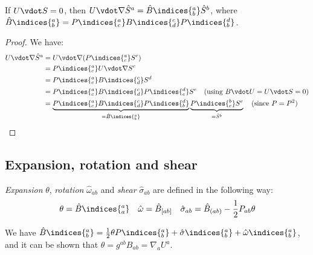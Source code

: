 \documentclass{jknotes}
\begin{document}
\begin{lemma}
    If \(U\vdot S = 0\), then \(U\vdot\nabla\hat{S}^a = \hat{B}\indices{^a_b}\hat{S}^b\), where \(\hat{B}\indices{^a_b} = P\indices{^a_c}B\indices{^c_d}P\indices{^d_b}\).
\end{lemma}
\begin{proof}
    We have:
    \begin{align}
        U\vdot\nabla\hat{S}^a &= U\vdot\nabla(P\indices{^a_c}S^c) \\
                              &= P\indices{^a_c}U\vdot\nabla S^c \\
                              &= P\indices{^a_c}B\indices{^c_d}S^d \\
                              &= P\indices{^a_c}B\indices{^c_d}P\indices{^d_e}S^e \quad \text{(using \(B\vdot U=U\vdot S=0\))} \\
                              &= \underbrace{P\indices{^a_c}B\indices{^c_d}P\indices{^d_b}}_{=\hat{B}\indices{^a_b}}\underbrace{P\indices{^b_e}S^e}_{=\hat{S}^b} \quad \text{(since \(P = P^2\))} \qedhere
    \end{align}
\end{proof}

\subsection{Expansion, rotation and shear}
\begin{defn}
    \emph{Expansion} \(\theta\), \emph{rotation} \(\hat{\omega}_{ab}\) and \emph{shear} \(\hat{\sigma}_{ab}\) are defined in the following way:
    \begin{equation}
        \theta = \hat{B}\indices{^a_a} \quad \hat{\omega} = \hat{B}_{[ab]} \quad \hat{\sigma}_{ab} = \hat{B}_{(ab)} - \frac{1}{2}P_{ab}\theta
    \end{equation}
\end{defn}
We have \(\hat{B}\indices{^a_b} = \frac{1}{2}\theta P\indices{^a_b} + \hat{\sigma}\indices{^a_b} + \hat{\omega}\indices{^a_b}\), and it can be shown that \(\theta = g^{ab}B_{ab} = \nabla_a U^a\).
\end{document}
